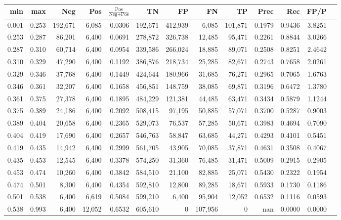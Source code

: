 \begin{tabular}{rrrrrrrrrrrrr}
\toprule
  min &   max &     Neg &    Pos & $\frac{\text{Pos}}{\text{Neg}+\text{Pos}}$ &      TN &      FP &      FN &      TP &   Prec &    Rec &   FP/P \\
\midrule
0.001 & 0.253 & 192,671 &  6,085 &                                     0.0306 & 192,671 & 412,939 &   6,085 & 101,871 & 0.1979 & 0.9436 & 3.8251 \\
0.253 & 0.287 &  86,201 &  6,400 &                                     0.0691 & 278,872 & 326,738 &  12,485 &  95,471 & 0.2261 & 0.8844 & 3.0266 \\
0.287 & 0.310 &  60,714 &  6,400 &                                     0.0954 & 339,586 & 266,024 &  18,885 &  89,071 & 0.2508 & 0.8251 & 2.4642 \\
0.310 & 0.329 &  47,290 &  6,400 &                                     0.1192 & 386,876 & 218,734 &  25,285 &  82,671 & 0.2743 & 0.7658 & 2.0261 \\
0.329 & 0.346 &  37,768 &  6,400 &                                     0.1449 & 424,644 & 180,966 &  31,685 &  76,271 & 0.2965 & 0.7065 & 1.6763 \\
0.346 & 0.361 &  32,207 &  6,400 &                                     0.1658 & 456,851 & 148,759 &  38,085 &  69,871 & 0.3196 & 0.6472 & 1.3780 \\
0.361 & 0.375 &  27,378 &  6,400 &                                     0.1895 & 484,229 & 121,381 &  44,485 &  63,471 & 0.3434 & 0.5879 & 1.1244 \\
0.375 & 0.389 &  24,186 &  6,400 &                                     0.2092 & 508,415 &  97,195 &  50,885 &  57,071 & 0.3700 & 0.5287 & 0.9003 \\
0.389 & 0.404 &  20,658 &  6,400 &                                     0.2365 & 529,073 &  76,537 &  57,285 &  50,671 & 0.3983 & 0.4694 & 0.7090 \\
0.404 & 0.419 &  17,690 &  6,400 &                                     0.2657 & 546,763 &  58,847 &  63,685 &  44,271 & 0.4293 & 0.4101 & 0.5451 \\
0.419 & 0.435 &  14,942 &  6,400 &                                     0.2999 & 561,705 &  43,905 &  70,085 &  37,871 & 0.4631 & 0.3508 & 0.4067 \\
0.435 & 0.453 &  12,545 &  6,400 &                                     0.3378 & 574,250 &  31,360 &  76,485 &  31,471 & 0.5009 & 0.2915 & 0.2905 \\
0.453 & 0.474 &  10,260 &  6,400 &                                     0.3842 & 584,510 &  21,100 &  82,885 &  25,071 & 0.5430 & 0.2322 & 0.1954 \\
0.474 & 0.501 &   8,300 &  6,400 &                                     0.4354 & 592,810 &  12,800 &  89,285 &  18,671 & 0.5933 & 0.1730 & 0.1186 \\
0.501 & 0.538 &   6,400 &  6,619 &                                     0.5084 & 599,210 &   6,400 &  95,904 &  12,052 & 0.6532 & 0.1116 & 0.0593 \\
0.538 & 0.993 &   6,400 & 12,052 &                                     0.6532 & 605,610 &       0 & 107,956 &       0 &    nan & 0.0000 & 0.0000 \\
\bottomrule
\end{tabular}
